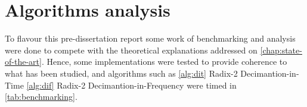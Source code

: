 \documentclass[
  oneside,
  11pt, a4paper,
  footinclude=true,
  headinclude=true,
  cleardoublepage=empty
]{scrbook}
\begin{document}














\chapter{Algorithms analysis}


To flavour this pre-dissertation report some work of benchmarking and analysis were done to compete with the theoretical explanations addressed on \autoref{chap:state-of-the-art}. Hence, some implementations were tested to provide coherence to what has been studied, and algorithms such as \autoref{alg:dit} Radix-2 Decimantion-in-Time \autoref{alg:dif} Radix-2 Decimantion-in-Frequency were timed in \autoref{tab:benchmarking}.
\end{document}
